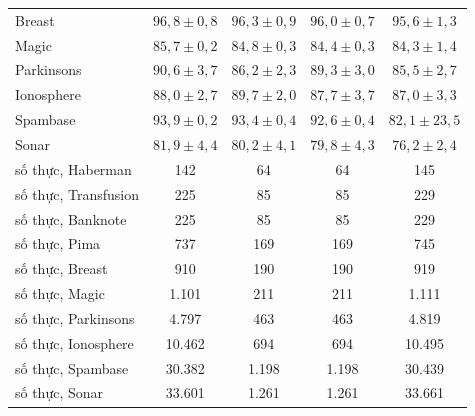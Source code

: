 \begin{table}[p]
\begin{tabular}{@{}l c c c c@{}}
Breast & $96{,}8\pm0{,}8$ & $96{,}3\pm0{,}9$ & $96{,}0\pm0{,}7$ & $95{,}6\pm1{,}3$\\
Magic & $85{,}7\pm0{,}2$ & $84{,}8\pm0{,}3$ & $84{,}4\pm0{,}3$ & $84{,}3\pm1{,}4$\\
Parkinsons & $90{,}6\pm3{,}7$ & $86{,}2\pm2{,}3$ & $89{,}3\pm3{,}0$ & $85{,}5\pm2{,}7$\\
Ionosphere & $88{,}0\pm2{,}7$ & $89{,}7\pm2{,}0$ & $87{,}7\pm3{,}7$ & $87{,}0\pm3{,}3$\\
Spambase & $93{,}9\pm0{,}2$ & $93{,}4\pm0{,}4$ & $92{,}6\pm0{,}4$ & $82{,}1\pm23{,}5$\\
Sonar & $81{,}9\pm4{,}4$ & $80{,}2\pm4{,}1$ & $79{,}8\pm4{,}3$ & $76{,}2\pm2{,}4$\\
\midrule
\quad số thực, Haberman & 142 & 64 & 64 & 145\\
\quad số thực, Transfusion & 225 & 85 & 85 & 229\\
\quad số thực, Banknote & 225 & 85 & 85 & 229\\
\quad số thực, Pima & 737 & 169 & 169 & 745\\
\quad số thực, Breast & 910 & 190 & 190 & 919\\
\quad số thực, Magic & 1.101 & 211 & 211 & 1.111\\
\quad số thực, Parkinsons & 4.797 & 463 & 463 & 4.819\\
\quad số thực, Ionosphere & 10.462 & 694 & 694 & 10.495\\
\quad số thực, Spambase & 30.382 & 1.198 & 1.198 & 30.439\\
\quad số thực, Sonar & 33.601 & 1.261 & 1.261 & 33.661\\
\bottomrule
\end{tabular}
\par\medskip
\end{table}
